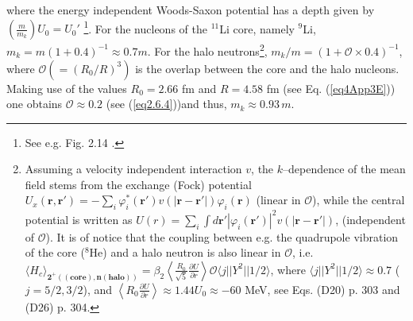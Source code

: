 where the energy independent Woods-Saxon potential has a depth given by\\\mbox{$\left(\frac{m}{m_k}\right)U_0=U_0'$} \footnote{See e.g. Fig. 2.14 \cite{Mahaux:85}.}. For the nucleons of the $^{11}$Li core, namely $^9$Li, $m_k=m(1+0.4)^{-1}\approx 0.7 m$. For the halo neutrons\footnote{\label{f117}Assuming a velocity independent interaction $v$, the $k$--dependence of the mean field stems from the exchange (Fock)  potential $U_x(\mathbf r, \mathbf r')=-\sum_i\varphi^*_i(\mathbf r')v(|\mathbf r-\mathbf r'|)\varphi_i(\mathbf r)$ (linear in $\mathcal O$), while the central potential is written as $U(r)=\sum_i\int d\mathbf r' |\varphi_i(\mathbf r')|^2v(|\mathbf r- \mathbf r'|)$, (independent of $\mathcal O$). It is of notice that the coupling between e.g. the quadrupole vibration of the core ($^8$He) and a halo neutron is also linear in $\mathcal O$, i.e. $\langle H_c\rangle_{\pmb{2^+((\text{core}),n (\text{halo}))}}=\beta_2\left\langle\frac{R_0}{\sqrt{5}}\frac{\partial U}{\partial r}\right\rangle\mathcal O\langle j||Y^2||1/2\rangle$, where $\langle j||Y^2||1/2\rangle\approx0.7$ ($j=5/2,3/2$), and $\left\langle R_0\frac{\partial U}{\partial r}\right\rangle\approx1.44 U_0\approx -60$ MeV, see \cite{Brink:05} Eqs. (D20) p. 303 and (D26) p. 304.}, $m_k/m=(1+\mathcal O\times0.4)^{-1}$, where $\mathcal O(=(R_0/R)^3)$ is the overlap between the core and the halo nucleons. Making use of the values $R_0=2.66$ fm and $R=4.58$ fm (see Eq. (\ref{eq4App3E}))  one obtains $\mathcal O\approx0.2$ (see (\ref{eq2.6.4}))and thus,  $m_k\approx 0.93 \,m$.
